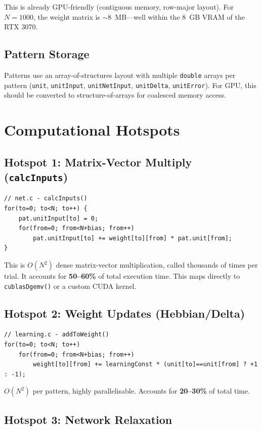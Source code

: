 \documentclass[11pt,a4paper]{article}
\begin{document}
This is already GPU-friendly (contiguous memory, row-major layout). For $N=1000$, the weight matrix is $\sim$8~MB---well within the 8~GB VRAM of the RTX 3070.

\subsection{Pattern Storage}

Patterns use an array-of-structures layout with multiple \texttt{double} arrays per pattern (\texttt{unit}, \texttt{unitInput}, \texttt{unitNetInput}, \texttt{unitDelta}, \texttt{unitError}). For GPU, this should be converted to structure-of-arrays for coalesced memory access.

\section{Computational Hotspots}

\subsection{Hotspot 1: Matrix-Vector Multiply (\texttt{calcInputs})}

\begin{lstlisting}
// net.c - calcInputs()
for(to=0; to<N; to++) {
    pat.unitInput[to] = 0;
    for(from=0; from<N+bias; from++)
        pat.unitInput[to] += weight[to][from] * pat.unit[from];
}
\end{lstlisting}

This is $O(N^2)$ dense matrix-vector multiplication, called thousands of times per trial. It accounts for \textbf{50--60\%} of total execution time. This maps directly to \texttt{cublasDgemv()} or a custom CUDA kernel.

\subsection{Hotspot 2: Weight Updates (Hebbian/Delta)}

\begin{lstlisting}
// learning.c - addToWeight()
for(to=0; to<N; to++)
    for(from=0; from<N+bias; from++)
        weight[to][from] += learningConst * (unit[to]==unit[from] ? +1 : -1);
\end{lstlisting}

$O(N^2)$ per pattern, highly parallelisable. Accounts for \textbf{20--30\%} of total time.

\subsection{Hotspot 3: Network Relaxation}
\end{document}
